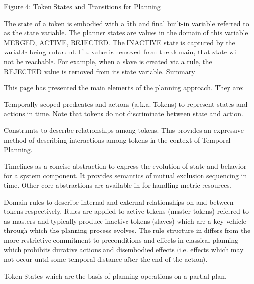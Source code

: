 Figure 4: Token States and Transitions for Planning

The state of a token is embodied with a 5th and final built-in
variable referred to as the state variable. The planner states are
values in the domain of this variable {MERGED, ACTIVE, REJECTED}. The
INACTIVE state is captured by the variable being unbound. If a value
is removed from the domain, that state will not be reachable. For
example, when a slave is created via a rule, the REJECTED value is
removed from its state variable.  Summary

This page has presented the main elements of the \eu planning
approach. They are:

Temporally scoped predicates and actions (a.k.a. Tokens) to represent
states and actions in time. Note that tokens do not discriminate
between state and action.

Constraints to describe relationships among tokens. This provides an
expressive method of describing interactions among tokens in the
context of Temporal Planning.

Timelines as a concise abstraction to express the evolution of state
and behavior for a system component. It provides semantics of mutual
exclusion sequencing in time. Other core abstractions are available in
\eu for handling metric resources.

Domain rules to describe internal and external relationships on and
between tokens respectively. Rules are applied to active tokens
(master tokens) referred to as masters and typically produce inactive
tokens (slaves) which are a key vehicle through which the planning
process evolves. The rule structure in \eu differs from the more
restrictive commitment to preconditions and effects in classical
planning which prohibits durative actions and disembodied effects
(i.e. effects which may not occur until some temporal distance after
the end of the action).

Token States which are the basis of planning operations on a partial
plan.
